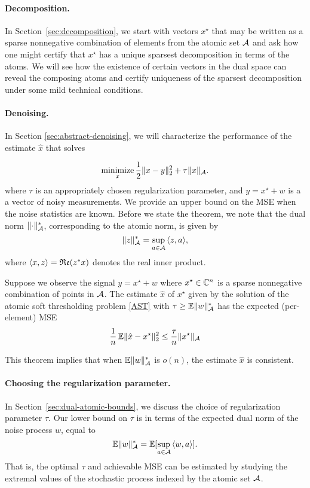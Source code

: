 \paragraph*{Decomposition.} In Section~\ref{sec:decomposition}, we start with
vectors $x^\star$ that may be written as a sparse nonnegative combination of
elements from the atomic set $\mathcal{A}$ and ask how one might certify that $x^\star$
has a unique sparsest decomposition in terms of the atoms. We will see how the
existence of certain vectors in the dual space can reveal the composing atoms
and certify uniqueness of the sparsest decomposition under some mild technical
conditions.

\paragraph*{Denoising.} In Section \ref{sec:abstract-denoising},
we will characterize the performance of the estimate $\hat{x}$ that solves

\begin{equation}
\label{AST}\mathop{\textrm{minimize}}_x \frac{1}{2} \lVert x - y\rVert_2^2 + \tau \lVert x\rVert_{\mathcal{A}}.
\end{equation}
where $\tau$ is an appropriately chosen regularization parameter, and $y =
x^\star + w$ is a a vector of noisy measurements. We provide an upper bound on
the MSE when the noise statistics are known. Before we state the theorem, we
note that the dual norm $\lVert\cdot\rVert_{\mathcal{A}}^*$, corresponding to the atomic norm,
is given by
\[
 \lVert z\rVert_{\mathcal{A}}^* = \sup_{a \in \mathcal{A}}{\langle z, a\rangle},
\]
where $\langle x, z\rangle = \mathop{\mathfrak{Re}}(z^*x)$ denotes the real inner product.  

\begin{theorem}
\label{cor:expected-mse}

Suppose we observe the signal $y = x^\star + w$ where $x^\star \in \mathbb{C}^n$ is a
sparse nonnegative combination of points in $\mathcal{A}$. The estimate $\hat{x}$ of
$x^\star$ given by the solution of the atomic soft thresholding problem
\eqref{AST} with $\tau \geq \operatorname{\mathbb{E}} \lVert w\rVert_{\mathcal{A}}^*$ has the expected (per-element)
MSE
\[ 
\frac{1}{n}\operatorname{\mathbb{E}} \lVert\hat{x} - x^\star\rVert_2^2 \leq \frac{\tau}{n}\lVert x^\star\rVert_{\mathcal{A}}
\]

\end{theorem}

This theorem implies that when $\operatorname{\mathbb{E}} \lVert w\rVert_{\mathcal{A}}^*$ is $o(n)$, the estimate
$\hat{x}$ is consistent.

\paragraph*{Choosing the regularization parameter.} In 
Section~\ref{sec:dual-atomic-bounds}, we discuss the choice of regularization
parameter $\tau$. Our lower bound on $\tau$ is in terms of the expected dual norm of the noise process $w$, equal to
 \[
 	\operatorname{\mathbb{E}} \lVert w\rVert_{\mathcal{A}}^* = \mathbb{E}[\sup_{a\in \mathcal{A}} {\langle w, a\rangle}].
 \]
That is, the optimal $\tau$ and achievable MSE can be estimated
by studying the extremal values of the stochastic process indexed by the atomic
set $\mathcal{A}$.

